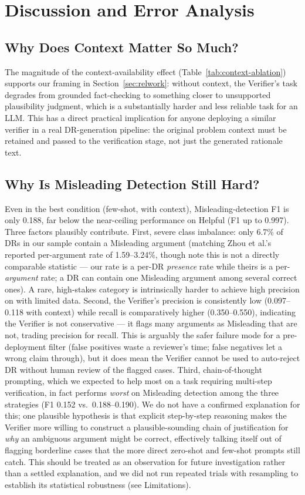 \documentclass[runningheads]{llncs}
\begin{document}
\section{Discussion and Error Analysis}
\label{sec:discussion}

\subsection{Why Does Context Matter So Much?}
The magnitude of the context-availability effect (Table~\ref{tab:context-ablation}) supports our framing in Section~\ref{sec:relwork}: without context, the Verifier's task degrades from grounded fact-checking to something closer to unsupported plausibility judgment, which is a substantially harder and less reliable task for an LLM. This has a direct practical implication for anyone deploying a similar verifier in a real DR-generation pipeline: the original problem context must be retained and passed to the verification stage, not just the generated rationale text.

\subsection{Why Is Misleading Detection Still Hard?}
Even in the best condition (few-shot, with context), Misleading-detection F1 is only 0.188, far below the near-ceiling performance on Helpful (F1 up to 0.997). Three factors plausibly contribute. First, severe class imbalance: only 6.7\% of DRs in our sample contain a Misleading argument (matching Zhou et al.'s reported per-argument rate of 1.59--3.24\%, though note this is not a directly comparable statistic --- our rate is a per-DR \emph{presence} rate while theirs is a per-\emph{argument} rate; a DR can contain one Misleading argument among several correct ones). A rare, high-stakes category is intrinsically harder to achieve high precision on with limited data. Second, the Verifier's precision is consistently low (0.097--0.118 with context) while recall is comparatively higher (0.350--0.550), indicating the Verifier is not conservative --- it flags many arguments as Misleading that are not, trading precision for recall. This is arguably the safer failure mode for a pre-deployment filter (false positives waste a reviewer's time; false negatives let a wrong claim through), but it does mean the Verifier cannot be used to auto-reject DR without human review of the flagged cases. Third, chain-of-thought prompting, which we expected to help most on a task requiring multi-step verification, in fact performs \emph{worst} on Misleading detection among the three strategies (F1 0.152 vs.\ 0.188--0.190). We do not have a confirmed explanation for this; one plausible hypothesis is that explicit step-by-step reasoning makes the Verifier more willing to construct a plausible-sounding chain of justification for \emph{why} an ambiguous argument might be correct, effectively talking itself out of flagging borderline cases that the more direct zero-shot and few-shot prompts still catch. This should be treated as an observation for future investigation rather than a settled explanation, and we did not run repeated trials with resampling to establish its statistical robustness (see Limitations).
\end{document}
